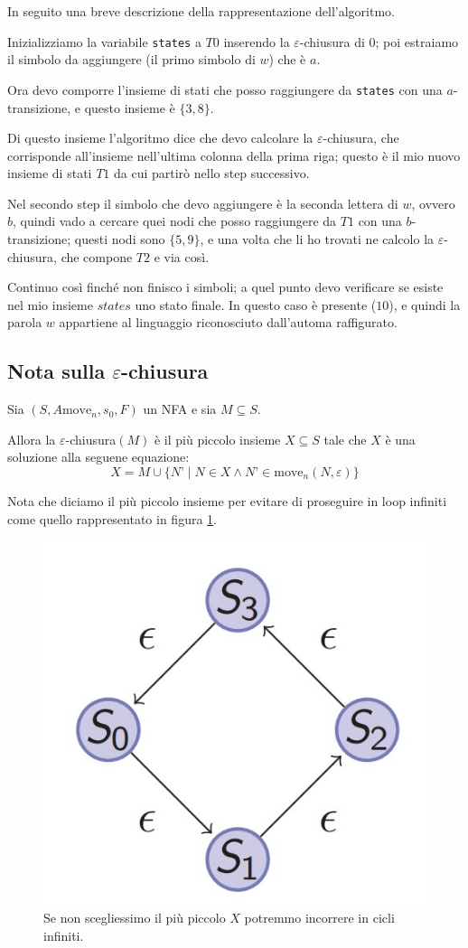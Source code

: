\documentclass[class=book, crop=false, oneside, 12pt]{standalone}
\begin{document}
\noindent In seguito una breve descrizione della rappresentazione dell'algoritmo.

Inizializziamo la variabile \texttt{states} a \(T0\) inserendo la \(\varepsilon\)-chiusura di \(0\); poi estraiamo il simbolo da aggiungere (il primo simbolo di \(w\)) che è \(a\).

Ora devo comporre l’insieme di stati che posso raggiungere da \texttt{states} con una \(a\)-transizione, e questo insieme è \(\{3, 8\}\). 

Di questo insieme l’algoritmo dice che devo calcolare la \(\varepsilon\)-chiusura, che corrisponde all’insieme nell’ultima colonna della prima riga; questo è il mio nuovo insieme di stati \(T1\) da cui partirò nello step successivo.

Nel secondo step il simbolo che devo aggiungere è la seconda lettera di \(w\), ovvero \(b\), quindi vado a cercare quei nodi che posso raggiungere da \(T1\) con una \(b\)-transizione; questi nodi sono \(\{5,9\}\), e una volta che li ho trovati ne calcolo la \(\varepsilon\)-chiusura, che compone \(T2\) e via così.

Continuo così finché non finisco i simboli; a quel punto devo verificare se esiste nel mio insieme \(states\) uno stato finale. In questo caso è presente (\(10\)), e quindi la parola \(w\) appartiene al linguaggio riconosciuto dall’automa raffigurato.


\subsection{Nota sulla \(\varepsilon\)-chiusura}
\begin{theorem}
    Sia \((S, A \textrm{move}_n, s_0, F)\) un NFA e sia \(M \subseteq S\).
    
    Allora la \(\varepsilon\)-chiusura\((M)\) è il più piccolo insieme \(X \subseteq S\) tale che \(X\) è una soluzione alla seguene equazione:
    \begin{equation}
        X = M \cup \{ N’ \mid N \in X \land N’ \in \textrm{move}_n (N,\varepsilon)\}
    \end{equation}
\end{theorem}

\noindent Nota che diciamo il più piccolo insieme per evitare di proseguire in loop infiniti come quello rappresentato in figura \ref{nfa_ciclico}.

\begin{figure}
    \centering
    \includegraphics[width=.3\textwidth,keepaspectratio]{nfa_ciclico}
    \caption{Se non scegliessimo il più piccolo \(X\) potremmo incorrere in cicli infiniti.}
    \label{nfa_ciclico}
\end{figure}
\end{document}

